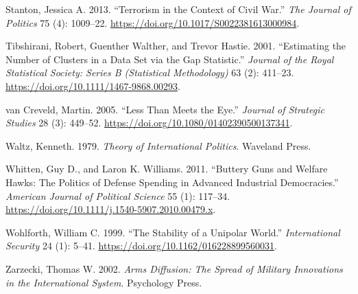 \documentclass[
]{article}
\newlength{\cslhangindent}
\newlength{\cslentryspacingunit} %
\newenvironment{CSLReferences}[2] %
 {%
  \setlength{\parindent}{0pt}
  \ifodd #1
  \let\oldpar\par
  \def\par{\hangindent=\cslhangindent\oldpar}
  \fi
  \setlength{\parskip}{#2\cslentryspacingunit}
 }%
 {}
\begin{document}
\begin{CSLReferences}{1}{0}
\leavevmode{}%
Stanton, Jessica A. 2013. {``Terrorism in the {Context} of {Civil War}.''} \emph{The Journal of Politics} 75 (4): 1009--22. \url{https://doi.org/10.1017/S0022381613000984}.

\leavevmode{}%
Tibshirani, Robert, Guenther Walther, and Trevor Hastie. 2001. {``Estimating the Number of Clusters in a Data Set via the Gap Statistic.''} \emph{Journal of the Royal Statistical Society: Series B (Statistical Methodology)} 63 (2): 411--23. \url{https://doi.org/10.1111/1467-9868.00293}.

\leavevmode{}%
van Creveld, Martin. 2005. {``Less Than {Meets} the {Eye}.''} \emph{Journal of Strategic Studies} 28 (3): 449--52. \url{https://doi.org/10.1080/01402390500137341}.

\leavevmode{}%
Waltz, Kenneth. 1979. \emph{Theory of {International Politics}}. {Waveland Press}.

\leavevmode{}%
Whitten, Guy D., and Laron K. Williams. 2011. {``Buttery {Guns} and {Welfare Hawks}: {The Politics} of {Defense Spending} in {Advanced Industrial Democracies}.''} \emph{American Journal of Political Science} 55 (1): 117--34. \url{https://doi.org/10.1111/j.1540-5907.2010.00479.x}.

\leavevmode{}%
Wohlforth, William C. 1999. {``The {Stability} of a {Unipolar World}.''} \emph{International Security} 24 (1): 5--41. \url{https://doi.org/10.1162/016228899560031}.

\leavevmode{}%
Zarzecki, Thomas W. 2002. \emph{Arms {Diffusion}: {The Spread} of {Military Innovations} in the {International System}}. {Psychology Press}.

\end{CSLReferences}
\end{document}
